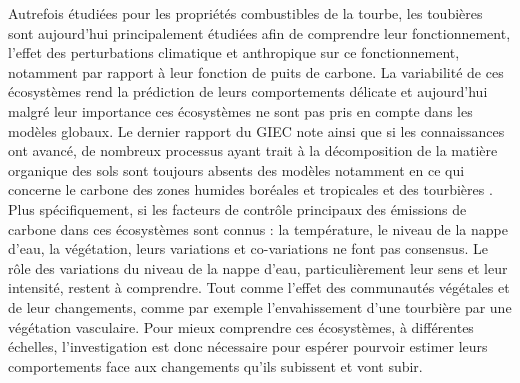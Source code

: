 Autrefois étudiées pour les propriétés combustibles de la tourbe, les toubières sont aujourd'hui principalement étudiées afin de comprendre leur fonctionnement, l'effet des perturbations climatique et anthropique sur ce fonctionnement, notamment par rapport à leur fonction de puits de carbone.
La variabilité de ces écosystèmes rend la prédiction de leurs comportements délicate et aujourd'hui malgré leur importance ces écosystèmes ne sont pas pris en compte dans les modèles globaux.
Le dernier rapport du GIEC note ainsi que si les connaissances ont avancé, de nombreux processus ayant trait à la décomposition de la matière organique des sols sont toujours absents des modèles notamment en ce qui concerne le carbone des zones humides boréales et tropicales et des tourbières \citep{Ciais2014}.
Plus spécifiquement, si les facteurs de contrôle principaux des émissions de carbone dans ces écosystèmes sont connus : la température, le niveau de la nappe d'eau, la végétation, leurs variations et co-variations ne font pas consensus. 
Le rôle des variations du niveau de la nappe d'eau, particulièrement leur sens et leur intensité, restent à comprendre.
Tout comme l'effet des communautés végétales et de leur changements, comme par exemple l'envahissement d'une tourbière par une végétation vasculaire.
Pour mieux comprendre ces écosystèmes, à différentes échelles, l'investigation est donc nécessaire pour espérer pourvoir estimer leurs comportements face aux changements qu'ils subissent et vont subir.



